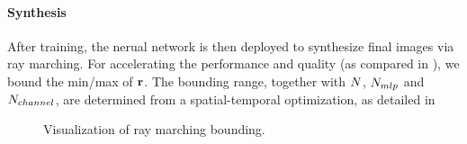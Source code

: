 \paragraph{Synthesis}
After training, the nerual network is then deployed to synthesize final images via ray marching. For accelerating the performance and quality (as compared in ), we bound the min/max of $\mathbf{r}$. The bounding range, together with $N$, $N_{mlp}$ and $N_{channel}$, are determined from a spatial-temporal optimization, as detailed in  %
\begin{figure}
    \centering
    \hspace{1em}
    \caption{Visualization of ray marching bounding.}
    \label{fig:method:bounding}
\end{figure}

